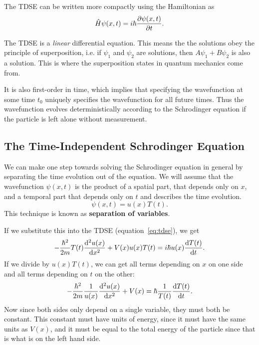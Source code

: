 \documentclass[../quantum_mechanics.tex]{subfiles}
\begin{document}
            The TDSE can be written more compactly using the Hamiltonian as
            \begin{equation}
                \hat{H}\psi(x,t)=i\hbar\pdv{\psi(x,t)}{t}.
            \end{equation}

            The TDSE is a \textit{linear} differential equation.
            This means the the solutions obey the principle of superposition, i.e. if $\psi_1$ and $\psi_2$ are solutions, then $A\psi_1+B\psi_2$ is also a solution.
            This is where the superposition states in quantum mechanics come from.

            It is also first-order in time, which implies that specifying the wavefunction at some time $t_0$ uniquely specifies the wavefunction for all future times.
            Thus the wavefunction evolves deterministically according to the Schrodinger equation if the particle is left alone without measurement.


        \subsection{The Time-Independent Schrodinger Equation}\label{the-time-independent-schrodinger-equation}
            We can make one step towards solving the Schrodinger equation in general by separating the time evolution out of the equation.
            We will assume that the wavefunction $\psi(x,t)$ is the product of a spatial part, that depends only on $x$, and a temporal part that depends only on $t$ and describes the time evolution.
            \begin{equation}
                \psi(x,t)=u(x)T(t).
            \end{equation}
            This technique is known as \textbf{separation of variables}.

            If we substitute this into the TDSE (equation~\ref{eq:tdse}), we get
            \begin{equation}
                -\frac{\hbar^2}{2m}T(t)\dv[2]{u(x)}{x}+V(x)u(x)T(t)=i\hbar u(x)\dv{T(t)}{t}.
            \end{equation}
            If we divide by $u(x)T(t)$, we can get all terms depending on $x$ on one side and all terms depending on $t$ on the other:
            \begin{equation}\label{eq:tdse-separated}
                -\frac{\hbar^2}{2m}\frac{1}{u(x)}\dv[2]{u(x)}{x}+V(x)=\hbar\frac{1}{T(t)}\dv{T(t)}{t}.
            \end{equation}
            Now since both sides only depend on a single variable, they must both be constant.
            This constant must have units of energy, since it must have the same units as $V(x)$, and it must be equal to the total energy of the particle since that is what is on the left hand side.
\end{document}
